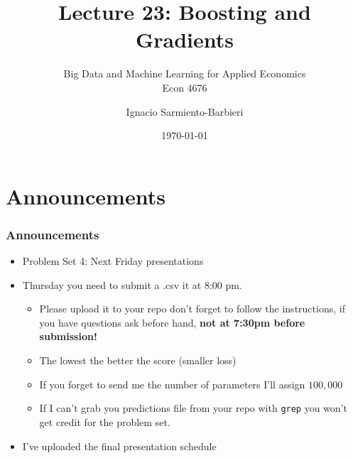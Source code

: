 \documentclass[
  shownotes,
  xcolor={svgnames},
  hyperref={colorlinks,citecolor=DarkBlue,linkcolor=DarkRed,urlcolor=DarkBlue}
  , aspectratio=169]{beamer}
\begin{document}
 
\title[Lecture 23]{Lecture 23:  Boosting and Gradients}
\subtitle{Big Data and Machine Learning for Applied Economics \\ Econ 4676}
\date{\today}

\author[Sarmiento-Barbieri]{Ignacio Sarmiento-Barbieri}


\begin{frame}[noframenumbering]
\maketitle
\end{frame}






\section{Announcements}
\begin{frame}
\frametitle{Announcements}

\begin{itemize}
\item Problem Set 4: Next Friday presentations
\medskip
\item Thursday you need to submit a .csv it at 8:00 pm. 
  \begin{itemize}
    \item Please upload it to your repo don't forget to follow the instructions, if you have questions ask before hand, {\bf not at 7:30pm before submission!} 
    \medskip
    \item The lowest the better the score (smaller loss)
    \medskip
    \item If you forget to send me the number of parameters I'll assign $100,000$
    \medskip
    \item If I can't grab you predictions file from your repo with  \texttt{grep} you won't get credit for the problem set.
  \end{itemize}
\medskip
\item I've uploaded the final presentation schedule
\end{itemize}

\end{frame}
\end{document}
